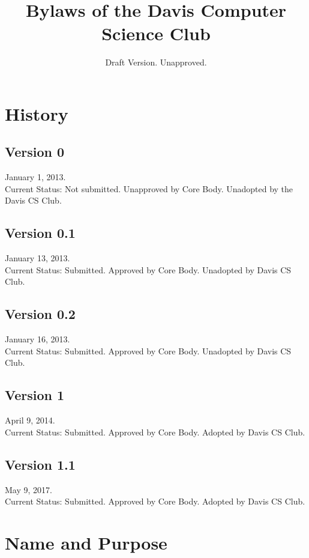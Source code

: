 \documentclass{article}
\title{Bylaws of the Davis Computer Science Club}
\author{}
\date{Draft Version. Unapproved.}
\begin{document}

\begin{titlepage}
	\maketitle
\end{titlepage}

\pagebreak

\section*{History}
\subsection*{Version 0}
January 1, 2013.\\
Current Status: Not submitted. Unapproved by Core Body. Unadopted by the Davis CS Club.
\subsection*{Version 0.1}
January 13, 2013.\\
Current Status: Submitted. Approved by Core Body. Unadopted by Davis CS Club.
\subsection*{Version 0.2}
January 16, 2013.\\
Current Status: Submitted. Approved by Core Body. Unadopted by Davis CS Club.
\subsection*{Version 1}
April 9, 2014.\\
Current Status: Submitted. Approved by Core Body. Adopted by Davis CS Club.
\subsection*{Version 1.1}
May 9, 2017.\\
Current Status: Submitted. Approved by Core Body. Adopted by Davis CS Club. 

\pagebreak

\tableofcontents

\pagebreak

\singlespacing
\sectionfont{\Large}
\subsectionfont{\large}

\section{Name and Purpose}
\end{document}
